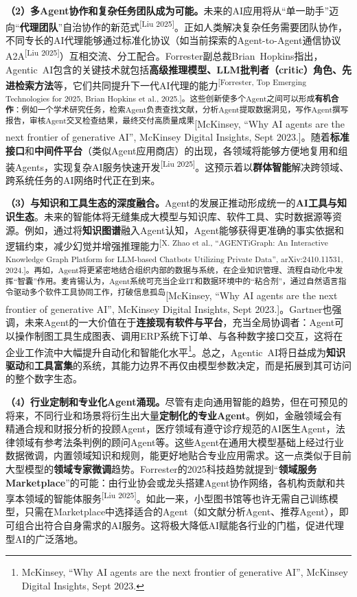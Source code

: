\documentclass[
  letterpaper,
]{scrbook}
\begin{document}
\textbf{（2）多Agent协作和复杂任务团队成为可能。}未来的AI应用将从``单一助手''迈向``\textbf{代理团队}''自治协作的新范式\textsuperscript{{[}Liu
2025{]}}。正如人类解决复杂任务需要团队协作，不同专长的AI代理能够通过标准化协议（如当前探索的Agent-to-Agent通信协议A2A\textsuperscript{{[}Liu
2025{]}}）互相交流、分工配合。Forrester副总裁Brian~Hopkins指出，Agentic~AI包含的关键技术就包括\textbf{高级推理模型、LLM批判者（critic）角色、先进检索方法}等，它们共同提升下一代AI代理的能力\textsuperscript{{[}Forrester,
Top Emerging Technologies for 2025, Brian Hopkins et al.,
2025.{]}。这些创新使多个Agent之间可以形成\textbf{有机合作}：例如一个学术研究任务，检索Agent负责查找文献，分析Agent提取数据洞见，写作Agent撰写报告，审核Agent交叉检查结果，最终交付高质量成果}{[}McKinsey,
``Why AI agents are the next frontier of generative AI'', McKinsey
Digital Insights, Sept
2023.{]}。随着\textbf{标准接口}和\textbf{中间件平台}（类似Agent应用商店）的出现，各领域将能够方便地复用和组装Agents，实现复杂AI服务快速开发\textsuperscript{{[}Liu
2025{]}}。这预示着以\textbf{群体智能}解决跨领域、跨系统任务的AI网络时代正在到来。

\textbf{（3）与知识和工具生态的深度融合。}Agent的发展正推动形成统一的\textbf{AI工具与知识生态}。未来的智能体将无缝集成大模型与知识库、软件工具、实时数据源等资源。例如，通过将\textbf{知识图谱}融入Agent认知，Agent能够获得更准确的事实依据和逻辑约束，减少幻觉并增强推理能力\textsuperscript{{[}X.
Zhao et al., ``AGENTiGraph: An Interactive Knowledge Graph Platform for
LLM-based Chatbots Utilizing Private Data'', arXiv:2410.11531,
2024.{]}。再如，Agent将更紧密地结合组织内部的数据与系统，在企业知识管理、流程自动化中发挥``智囊''作用。麦肯锡认为，Agent系统可充当企业IT和数据环境中的``粘合剂''，通过自然语言指令驱动多个软件工具协同工作，打破信息孤岛}{[}McKinsey,
``Why AI agents are the next frontier of generative AI'', McKinsey
Digital Insights, Sept
2023.{]}。Gartner也强调，未来Agent的一大价值在于\textbf{连接现有软件与平台}，充当全局协调者：Agent可以操作制图工具生成图表、调用ERP系统下订单、与各种数字接口交互，这将在企业工作流中大幅提升自动化和智能化水平\footnote{McKinsey,
  ``Why AI agents are the next frontier of generative AI'', McKinsey
  Digital Insights, Sept 2023.}。总之，Agentic~AI将日益成为\textbf{知识驱动}和\textbf{工具富集}的系统，其能力边界不再仅由模型参数决定，而是拓展到其可访问的整个数字生态。

\textbf{（4）行业定制和专业化Agent涌现。}尽管有走向通用智能的趋势，但在可预见的将来，不同行业和场景将衍生出大量\textbf{定制化的专业Agent}。例如，金融领域会有精通合规和财报分析的投顾Agent，医疗领域有遵守诊疗规范的AI医生Agent，法律领域有参考法条判例的顾问Agent等。这些Agent在通用大模型基础上经过行业数据微调，内置领域知识和规则，能更好地贴合专业应用需求。这一点类似于目前大型模型的\textbf{领域专家微调}趋势。Forrester的2025科技趋势就提到``\textbf{领域服务Marketplace}''的可能：由行业协会或龙头搭建Agent协作网络，各机构贡献和共享本领域的智能体服务\textsuperscript{{[}Liu
2025{]}}。如此一来，小型图书馆等也许无需自己训练模型，只需在Marketplace中选择适合的Agent（如文献分析Agent、推荐Agent），即可组合出符合自身需求的AI服务。这将极大降低AI赋能各行业的门槛，促进代理型AI的广泛落地。
\end{document}
